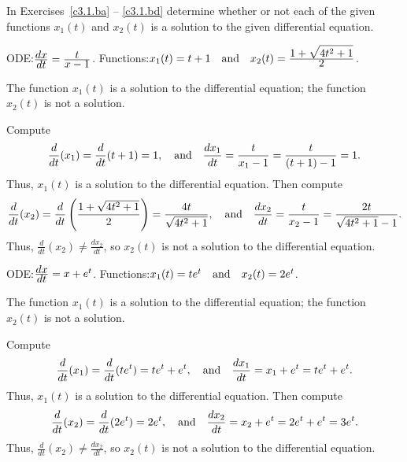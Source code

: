 \documentclass{ximera}
\begin{document}
\noindent In Exercises~\ref{c3.1.ba} -- \ref{c3.1.bd} determine whether
or not each of the given functions $x_1(t)$ and $x_2(t)$ is a solution 
to the given differential equation.
\begin{exercise}  \label{c3.1.ba}
ODE:\quad $\frac{\displaystyle dx}{\displaystyle dt} = \frac{\displaystyle t}{\displaystyle x-1}$.
Functions:\quad $x_1(t)=t+1 \quad\mbox{and}\quad x_2(t)= \frac{\displaystyle 1+\sqrt{4t^2+1}}{\displaystyle 2}$.

\begin{solution}

\ans The function $x_1(t)$ is a solution to the differential equation;
the function $x_2(t)$ is not a solution.

\soln Compute
\[
\frac{d}{dt}(x_1) = \frac{d}{dt}(t + 1) = 1, \quad\mbox{and}\quad
\frac{dx_1}{dt} = \frac{t}{x_1 - 1} = \frac{t}{(t + 1) - 1} = 1.
\]
Thus, $x_1(t)$ is a solution to the differential equation.  Then compute
\[
\frac{d}{dt}(x_2) = \frac{d}{dt}\left(\frac{1 + \sqrt{4t^2 + 1}}{2}\right)
= \frac{4t}{\sqrt{4t^2 + 1}}, \quad\mbox{and}\quad
\frac{dx_2}{dt} = \frac{t}{x_2 - 1} = \frac{2t}{\sqrt{4t^2 + 1} - 1}.
\]
Thus, $\frac{d}{dt}(x_2) \neq \frac{dx_2}{dt}$, so $x_2(t)$ is not a
solution to the differential equation.


\end{solution}
\end{exercise}
\begin{exercise}  \label{c3.1.bb}
ODE:\quad $\frac{\displaystyle dx}{\displaystyle dt} = x + e^t$.
Functions:\quad $x_1(t)=te^t \quad\mbox{and}\quad x_2(t)= 2e^t$.

\begin{solution}

\ans The function $x_1(t)$ is a solution to the differential equation;
the function $x_2(t)$ is not a solution.

\soln Compute
\[
\frac{d}{dt}(x_1) = \frac{d}{dt}(te^t) = te^t + e^t, \quad\mbox{and}\quad
\frac{dx_1}{dt} = x_1 + e^t = te^t + e^t.
\]
Thus, $x_1(t)$ is a solution to the differential equation.  Then compute
\[
\frac{d}{dt}(x_2) = \frac{d}{dt}(2e^t) = 2e^t, \quad\mbox{and}\quad
\frac{dx_2}{dt} = x_2 + e^t = 2e^t + e^t = 3e^t.
\]
Thus, $\frac{d}{dt}(x_2) \neq \frac{dx_2}{dt}$, so $x_2(t)$ is not a
solution to the differential equation.

\end{solution}
\end{exercise}
\end{document}
